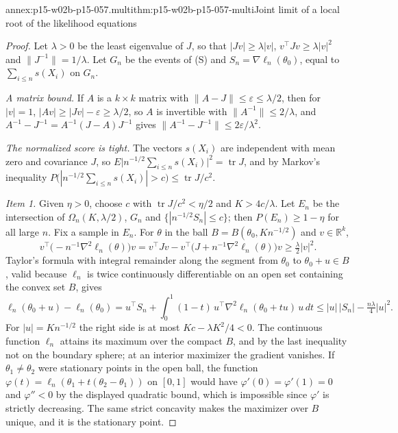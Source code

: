\begin{annexitem}{annex:p15-w02b-p15-057.multi}{thm:p15-w02b-p15-057-multi}{Joint limit of a local root of the likelihood equations}
\begin{proof}
Let \(\lambda>0\) be the least eigenvalue of \(J\), so that
\(|Jv|\geq\lambda|v|\), \(v^{\top}Jv\geq\lambda|v|^2\) and
\(\|J^{-1}\|=1/\lambda\). Let \(G_n\) be the events of (S) and
\(S_n=\nabla\ell_n(\theta_0)\), equal to \(\sum_{i\leq n}s(X_i)\) on
\(G_n\).

\emph{A matrix bound.} If \(A\) is a \(k\times k\) matrix with
\(\|A-J\|\leq\varepsilon\leq\lambda/2\), then for \(|v|=1\),
\(|Av|\geq|Jv|-\varepsilon\geq\lambda/2\), so \(A\) is invertible with
\(\|A^{-1}\|\leq2/\lambda\), and
\(A^{-1}-J^{-1}=A^{-1}(J-A)J^{-1}\) gives
\(\|A^{-1}-J^{-1}\|\leq2\varepsilon/\lambda^2\).

\emph{The normalized score is tight.} The vectors \(s(X_i)\) are
independent with mean zero and covariance \(J\), so
\(E\bigl|n^{-1/2}\sum_{i\leq n}s(X_i)\bigr|^2=\operatorname{tr}J\), and by
Markov's inequality
\(P\bigl(|n^{-1/2}\sum_{i\leq n}s(X_i)|>c\bigr)\leq\operatorname{tr}J/c^2\).

\emph{Item 1.} Given \(\eta>0\), choose \(c\) with
\(\operatorname{tr}J/c^2<\eta/2\) and \(K>4c/\lambda\). Let \(E_n\) be the
intersection of \(\Omega_n(K,\lambda/2)\), \(G_n\) and
\(\{|n^{-1/2}S_n|\leq c\}\); then \(P(E_n)\geq1-\eta\) for all large
\(n\). Fix a sample in \(E_n\). For \(\theta\) in the ball
\(B=B(\theta_0,Kn^{-1/2})\) and \(v\in\mathbb R^k\),
\[
 v^{\top}\bigl(-n^{-1}\nabla^2\ell_n(\theta)\bigr)v
 =v^{\top}Jv-v^{\top}\bigl(J+n^{-1}\nabla^2\ell_n(\theta)\bigr)v
 \geq\tfrac{\lambda}{2}|v|^2 .
\]
Taylor's formula with integral remainder along the segment from
\(\theta_0\) to \(\theta_0+u\in B\), valid because \(\ell_n\) is twice
continuously differentiable on an open set containing the convex set
\(B\), gives
\[
 \ell_n(\theta_0+u)-\ell_n(\theta_0)
 =u^{\top}S_n+\int_0^1(1-t)\,u^{\top}\nabla^2\ell_n(\theta_0+tu)\,u\,dt
 \leq|u|\,|S_n|-\tfrac{n\lambda}{4}|u|^2 .
\]
For \(|u|=Kn^{-1/2}\) the right side is at most
\(Kc-\lambda K^2/4<0\). The continuous function \(\ell_n\) attains its
maximum over the compact \(B\), and by the last inequality not on the
boundary sphere; at an interior maximizer the gradient vanishes. If
\(\theta_1\neq\theta_2\) were stationary points in the open ball, the
function \(\varphi(t)=\ell_n(\theta_1+t(\theta_2-\theta_1))\) on
\([0,1]\) would have \(\varphi'(0)=\varphi'(1)=0\) and
\(\varphi''<0\) by the displayed quadratic bound, which is impossible
since \(\varphi'\) is strictly decreasing. The same strict concavity makes
the maximizer over \(B\) unique, and it is the stationary point.


\end{proof}
\end{annexitem}
